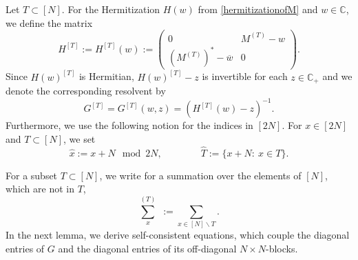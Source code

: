 \documentclass[11pt]{article}
\newcommand{\C}{\mathbb{C}}
\theoremstyle{plain}
\theoremstyle{remark}
\numberwithin{equation}{section}
\newcommand*\bset[1]{[#1]}
\newcommand*\ubarr[1]{{\widehat{#1}}}
\begin{document}
	
	Let $T \subset [N]$. For the Hermitization $H(w)$ from \cref{hermitizationofM} and $w \in \C$, 
	we define the matrix 
	\begin{equation}\label{hermitizationofM(T)}
		H^{\bset{T}}:= H^{\bset{T}}(w) :=\left(
		\begin{array}{ccc}
			0                       &       M^{(T)}-w \\
			
			(M^{(T)})^{\ast}- \overline{w}  & 0
		\end{array}
		\right).
	\end{equation}
	Since $H(w)^{[T]}$ is Hermitian, $H(w)^{[T]}-z$ is invertible for each $z \in \C_+$ and we denote the 
	corresponding resolvent by 
	\begin{equation}\label{eq:GreenfunctionM(T)}
		G^{\bset{T}}=G^{\bset{T}}(w,z) = (H^{\bset{T}}(w)- z)^{-1}.
	\end{equation}
	Furthermore, we use the following notion for the indices in $[2N]$. For $x \in [2N]$ and $T \subset [N]$, we set
	\begin{equation*}
		\ubarr{x}:= x+N \mod 2N, \qquad \qquad \ubarr{T}:= \{ x + N:~ x \in T\}.
	\end{equation*}
	
	For a subset $T \subset [N]$, we write for a summation over the elements of $[N]$, which are not in $T$, 
	\begin{equation*}
		\sum_{x}^{(T)} \,\, := \sum_{x \in [N]\backslash T}.
	\end{equation*}
In the next lemma, we derive self-consistent equations, which couple the diagonal entries of $G$ and the diagonal entries of its off-diagonal $N \times N$-blocks.  
	
\end{document}
